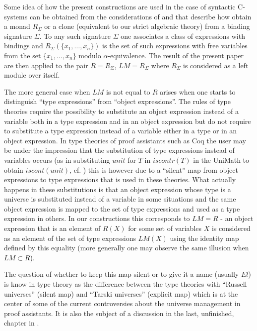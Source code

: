 \documentclass[11pt]{article}
\begin{document}
Some idea of how the present constructions are used in the case of syntactic C-systems can be obtained from the considerations of \cite{HM2007} and \cite{FPT} that describe how obtain a monad $R_{\Sigma}$ or a clone (equivalent to our strict algebraic theory) from a binding signature $\Sigma$. To any such signature $\Sigma$ one associates a class of expressions with bindings and $R_{\Sigma}(\{x_1,\dots,x_n\})$ is the set of such expressions with free variables from the set $\{x_1,\dots,x_n\}$ modulo $\alpha$-equivalence.  The result of the present paper are then applied to the pair $R=R_{\Sigma}$, $LM=R_{\Sigma}$ where $R_{\Sigma}$ is considered as a left module over itself. 

The more general case when $LM$ is not equal to $R$ arises when one starts to distinguish ``type expressions'' from ``object expressions''. The rules of type theories require the possibility to substitute an object expression instead of a variable both in a type expression and in an object expression but do not require to substitute a type expression instead of a variable either in a type or in an object expression. In type theories of proof assistants such as Coq the user may be under the impression that the substitution of type expressions instead of variables occurs (as in substituting $unit$ for $T$ in $iscontr(T)$ in the UniMath to obtain $iscont(unit)$, cf. \cite{UniMath2015}) this is however due to a ``silent'' map from object expressions to type expressions that is used in these theories. What actually happens in these substitutions is that an object expression whose type is a universe is substituted instead of a variable in some situations and the same object expression is mapped to the set of type expressions and used as a type expression in others. In our constructions this corresponds to $LM=R$ - an object expression that is an element of $R(X)$ for some set of variables $X$ is considered as an element of the set of type expressions $LM(X)$ using the identity map defined by this equality (more generally one may observe the same illusion when $LM\subset R$). 

The question of whether to keep this map silent or to give it a name (usually $El$) is know in type theory as the difference between the type theories with ``Russell universes'' (silent map) and ``Tarski universes'' (explicit map) which is at the center of some of the current controversies about the universe management in proof assistants. It is also the subject of a discussion in the last, unfinished, chapter in \cite{Bibliopolis}. 
\end{document}
